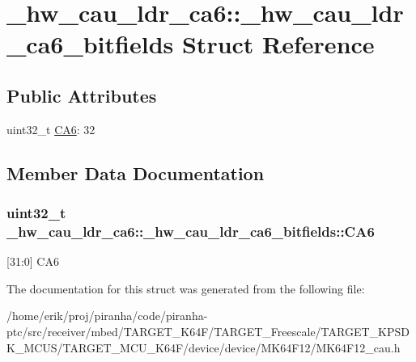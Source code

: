\hypertarget{struct__hw__cau__ldr__ca6_1_1__hw__cau__ldr__ca6__bitfields}{}\section{\+\_\+hw\+\_\+cau\+\_\+ldr\+\_\+ca6\+:\+:\+\_\+hw\+\_\+cau\+\_\+ldr\+\_\+ca6\+\_\+bitfields Struct Reference}
\label{struct__hw__cau__ldr__ca6_1_1__hw__cau__ldr__ca6__bitfields}
\subsection*{Public Attributes}
\begin{DoxyCompactItemize}
\item 
uint32\+\_\+t \hyperlink{struct__hw__cau__ldr__ca6_1_1__hw__cau__ldr__ca6__bitfields_ad4cb0b1a62564817eec6a6e9a2507e09}{C\+A6}\+: 32
\end{DoxyCompactItemize}


\subsection{Member Data Documentation}
\subsubsection[{\texorpdfstring{C\+A6}{CA6}}]{\setlength{\rightskip}{0pt plus 5cm}uint32\+\_\+t \+\_\+hw\+\_\+cau\+\_\+ldr\+\_\+ca6\+::\+\_\+hw\+\_\+cau\+\_\+ldr\+\_\+ca6\+\_\+bitfields\+::\+C\+A6}\hypertarget{struct__hw__cau__ldr__ca6_1_1__hw__cau__ldr__ca6__bitfields_ad4cb0b1a62564817eec6a6e9a2507e09}{}\label{struct__hw__cau__ldr__ca6_1_1__hw__cau__ldr__ca6__bitfields_ad4cb0b1a62564817eec6a6e9a2507e09}
\mbox{[}31\+:0\mbox{]} C\+A6 

The documentation for this struct was generated from the following file\+:\begin{DoxyCompactItemize}
\item 
/home/erik/proj/piranha/code/piranha-\/ptc/src/receiver/mbed/\+T\+A\+R\+G\+E\+T\+\_\+\+K64\+F/\+T\+A\+R\+G\+E\+T\+\_\+\+Freescale/\+T\+A\+R\+G\+E\+T\+\_\+\+K\+P\+S\+D\+K\+\_\+\+M\+C\+U\+S/\+T\+A\+R\+G\+E\+T\+\_\+\+M\+C\+U\+\_\+\+K64\+F/device/device/\+M\+K64\+F12/M\+K64\+F12\+\_\+cau.\+h\end{DoxyCompactItemize}
